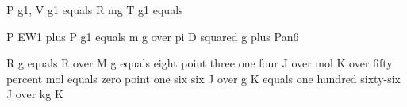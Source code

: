 P g1, V g1 equals R mg T g1 equals

P EW1 plus P g1 equals m g over pi D squared g plus Pan6

R g equals R over M g equals eight point three one four J over mol K over fifty percent mol equals zero point one six six J over g K equals one hundred sixty-six J over kg K